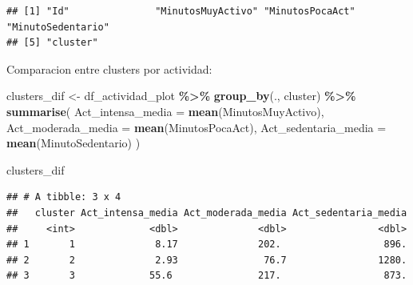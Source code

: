 \documentclass[
]{article}
\newenvironment{Shaded}{\begin{snugshade}}{\end{snugshade}}
\newcommand{\AttributeTok}[1]{\textcolor[rgb]{0.13,0.29,0.53}{#1}}
\newcommand{\FunctionTok}[1]{\textcolor[rgb]{0.13,0.29,0.53}{\textbf{#1}}}
\newcommand{\NormalTok}[1]{#1}
\newcommand{\OtherTok}[1]{\textcolor[rgb]{0.56,0.35,0.01}{#1}}
\newcommand{\SpecialCharTok}[1]{\textcolor[rgb]{0.81,0.36,0.00}{\textbf{#1}}}
\begin{document}
\begin{verbatim}
## [1] "Id"               "MinutosMuyActivo" "MinutosPocaAct"   "MinutoSedentario"
## [5] "cluster"
\end{verbatim}

Comparacion entre clusters por actividad:

\begin{Shaded}
\begin{Highlighting}[]
\NormalTok{clusters\_dif }\OtherTok{\textless{}{-}}\NormalTok{ df\_actividad\_plot }\SpecialCharTok{\%\textgreater{}\%} \FunctionTok{group\_by}\NormalTok{(., cluster) }\SpecialCharTok{\%\textgreater{}\%} 
  \FunctionTok{summarise}\NormalTok{(}
    \AttributeTok{Act\_intensa\_media =} \FunctionTok{mean}\NormalTok{(MinutosMuyActivo),}
    \AttributeTok{Act\_moderada\_media =} \FunctionTok{mean}\NormalTok{(MinutosPocaAct),}
    \AttributeTok{Act\_sedentaria\_media =} \FunctionTok{mean}\NormalTok{(MinutoSedentario)}
\NormalTok{)}

\NormalTok{clusters\_dif}
\end{Highlighting}
\end{Shaded}

\begin{verbatim}
## # A tibble: 3 x 4
##   cluster Act_intensa_media Act_moderada_media Act_sedentaria_media
##     <int>             <dbl>              <dbl>                <dbl>
## 1       1              8.17              202.                  896.
## 2       2              2.93               76.7                1280.
## 3       3             55.6               217.                  873.
\end{verbatim}
\end{document}
